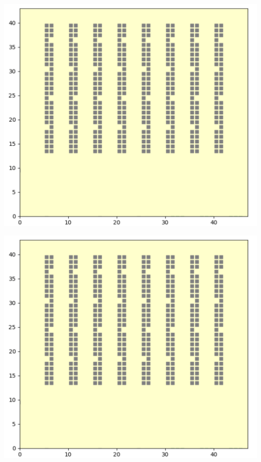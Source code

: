 \documentclass[12pt]{article}
\begin{document}
\begin{minipage}[ht]{0.45\linewidth}
\label{ambienteSimulatore}
\centering
\includegraphics[width=\textwidth]{Figures/Map/Corsie.png}
\end{minipage}
\hspace{0.5cm}
\begin{minipage}[ht]{0.45\linewidth}
\centering
\includegraphics[width=\textwidth]{Figures/Map/Corsie.png}
\end{minipage}
\end{document}

